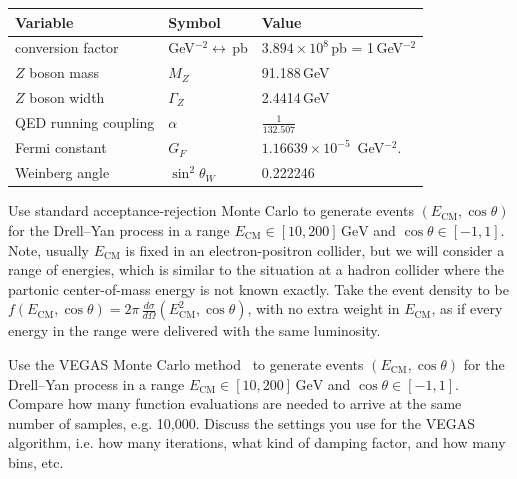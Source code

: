 \begin{center}
  \begin{tabular}{lll}
    Variable             & Symbol                        & Value                                  \\ \hline
    conversion factor    & GeV$^{-2}\leftrightarrow$\,pb & $3.894\times 10^8$\,pb = 1\,GeV$^{-2}$ \\
    $Z$ boson mass       & $M_Z$                         & 91.188\,GeV                            \\
    $Z$ boson width      & $\Gamma_Z$                    & 2.4414\,GeV                            \\
    QED running coupling & $\alpha$                      & $\frac{1}{132.507}$                    \\
    Fermi constant       & $G_F$                         & $1.16639\times 10^{-5}$~GeV$^{-2}$.    \\
    Weinberg angle       & $\sin^2 \theta_W$             & 0.222246                               \\
  \end{tabular}
\end{center}

\begin{problem}
  Use standard acceptance-rejection Monte Carlo to generate events $(E_\text{CM}, \cos\theta)$ for the Drell--Yan process in a range $E_\text{CM} \in [10, 200]\,\text{GeV}$ and $\cos\theta \in [-1, 1]$.
  Note, usually $E_\text{CM}$ is fixed in an electron-positron collider, but we will consider a range of energies, which is similar to the situation at a hadron collider where the partonic center-of-mass energy is not known exactly.
  Take the event density to be $f(E_\text{CM}, \cos\theta) = 2\pi\,\frac{d\sigma}{d\Omega}(E_\text{CM}^2, \cos\theta)$, with no extra weight in $E_\text{CM}$, as if every energy in the range were delivered with the same luminosity.
\end{problem}

\begin{problem}
  Use the VEGAS Monte Carlo method~\cite{Lepage:1977sw,Lepage:2020tgj} to generate events $(E_\text{CM}, \cos\theta)$ for the Drell--Yan process in a range $E_\text{CM} \in [10, 200]\,\text{GeV}$ and $\cos\theta \in [-1, 1]$.
  Compare how many function evaluations are needed to arrive at the same number of samples, e.g. 10,000.
  Discuss the settings you use for the VEGAS algorithm, i.e. how many iterations, what kind of damping factor, and how many bins, etc.
\end{problem}

